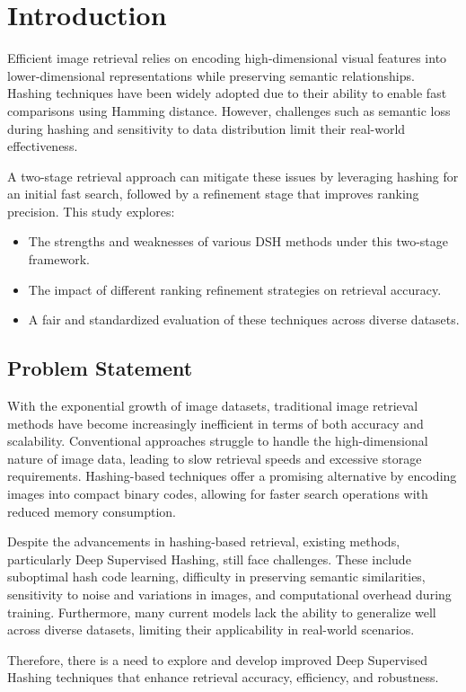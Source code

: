 \section{Introduction}
Efficient image retrieval relies on encoding high-dimensional visual features into lower-dimensional representations while preserving semantic relationships.
Hashing techniques have been widely adopted due to their ability to enable fast comparisons using Hamming distance. 
However, challenges such as semantic loss during hashing and sensitivity to data distribution limit their real-world effectiveness.

A two-stage retrieval approach can mitigate these issues by leveraging hashing for an initial fast search, followed by a refinement stage that improves ranking precision. This study explores:

\begin{itemize}
    \item 
    The strengths and weaknesses of various DSH methods under this two-stage framework.
    \item
    The impact of different ranking refinement strategies on retrieval accuracy.
    \item
    A fair and standardized evaluation of these techniques across diverse datasets. 
\end{itemize}

\subsection{Problem Statement}

With the exponential growth of image datasets, traditional image retrieval methods have become increasingly inefficient in terms of both accuracy and scalability. Conventional approaches struggle to handle the high-dimensional nature of image data, leading to slow retrieval speeds and excessive storage requirements. Hashing-based techniques offer a promising alternative by encoding images into compact binary codes, allowing for faster search operations with reduced memory consumption.

Despite the advancements in hashing-based retrieval, existing methods, particularly Deep Supervised Hashing, still face challenges. These include suboptimal hash code learning, difficulty in preserving semantic similarities, sensitivity to noise and variations in images, and computational overhead during training. Furthermore, many current models lack the ability to generalize well across diverse datasets, limiting their applicability in real-world scenarios.

Therefore, there is a need to explore and develop improved Deep Supervised Hashing techniques that enhance retrieval accuracy, efficiency, and robustness. 







